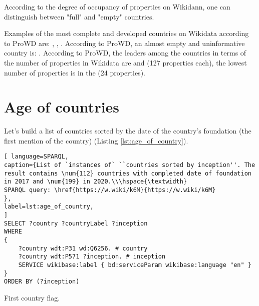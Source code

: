 According to the degree of occupancy of properties on Wikidann, one can distinguish between "full" and "empty" countries.

Examples of the most complete and developed countries on Wikidata according to ProWD are: , , . According to ProWD, an almost empty and uninformative country is: . According to ProWD, the leaders among the countries in terms of the number of properties in Wikidata are  and  (127 properties each), the lowest number of properties is in the   (24 properties).


\section{Age of countries}

Let's build a list of countries sorted by the date of the country's foundation (the first mention of the country) (Listing \ref{lst:age_of_country}).

\begin{lstlisting}[ language=SPARQL, 
caption={List of `instances of` ``countries sorted by inception''. The result contains \num{112} countries with completed date of foundation in 2017 and \num{199} in 2020.\\\hspace{\textwidth}
SPARQL query: \href{https://w.wiki/k6M}{https://w.wiki/k6M}
},
label=lst:age_of_country, 					
]
SELECT ?country ?countryLabel ?inception
WHERE
{
	?country wdt:P31 wd:Q6256. # country
	?country wdt:P571 ?inception. # inception
	SERVICE wikibase:label { bd:serviceParam wikibase:language "en" }
}
ORDER BY (?inception)
\end{lstlisting}


\begin{marginfigure}[-0.8cm]
	{
		\setlength{\fboxsep}{0pt}%
		\setlength{\fboxrule}{1pt}%
	}
	\caption{First country flag.}%
	\label{fig:flag_kor}%
\end{marginfigure}

